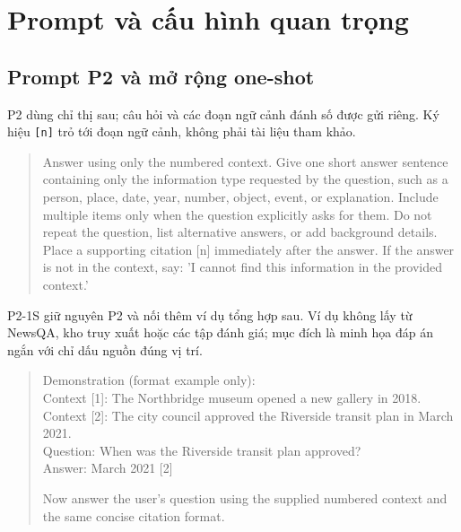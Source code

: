 \section{Prompt và cấu hình quan trọng}\label{app:prompts}
\subsection{Prompt P2 và mở rộng one-shot}
P2 dùng chỉ thị sau; câu hỏi và các đoạn ngữ cảnh đánh số được gửi riêng. Ký hiệu \texttt{[n]} trỏ tới đoạn ngữ cảnh, không phải tài liệu tham khảo.
\begin{quote}\small{}
Answer using only the numbered context. Give one short answer sentence
containing only the information type requested by the question, such as
a person, place, date, year, number, object, event, or explanation.
Include multiple items only when the question explicitly asks for them.
Do not repeat the question, list alternative answers, or add background
details. Place a supporting citation [n] immediately after the answer.
If the answer is not in the context, say: 'I cannot find this information
in the provided context.'
\end{quote}
P2-1S giữ nguyên P2 và nối thêm ví dụ tổng hợp sau. Ví dụ không lấy từ NewsQA, kho truy xuất hoặc các tập đánh giá; mục đích là minh họa đáp án ngắn với chỉ dấu nguồn đúng vị trí.
\begin{quote}\small{}
Demonstration (format example only):\\
Context [1]: The Northbridge museum opened a new gallery in 2018.\\
Context [2]: The city council approved the Riverside transit plan in March 2021.\\
Question: When was the Riverside transit plan approved?\\
Answer: March 2021 [2]

Now answer the user's question using the supplied numbered context and the same concise citation format.
\end{quote}

